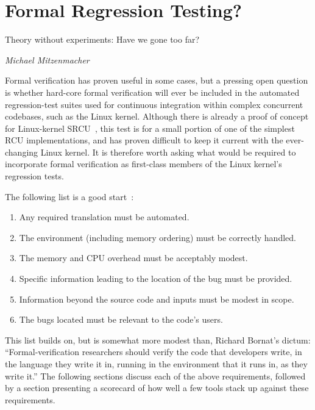 
\section{Formal Regression Testing?}
\label{sec:future:Formal Regression Testing?}
%
\epigraph{Theory without experiments: Have we gone too far?}
	 {\emph{Michael Mitzenmacher}}

Formal verification has proven useful in some cases, but a pressing open
question is whether hard-core formal verification will ever be included
in the automated regression-test suites used for continuous integration
within complex concurrent codebases, such as the Linux kernel.
Although there is already a proof of concept for Linux-kernel
SRCU~\cite{LanceRoy2017CBMC-SRCU}, this test is for a small portion
of one of the simplest RCU implementations, and has proven difficult
to keep it current with the ever-changing Linux kernel.
It is therefore worth asking what would be required to incorporate
formal verification as first-class members of the Linux kernel's
regression tests.

The following list is a good
start~\cite[slide 34]{PaulEMcKenney2015DagstuhlVerification}:

\begin{enumerate}
\item	Any required translation must be automated.
\item	The environment (including memory ordering) must be correctly
	handled.
\item	The memory and CPU overhead must be acceptably modest.
\item	Specific information leading to the location of the bug
	must be provided.
\item	Information beyond the source code and inputs must be
	modest in scope.
\item	The bugs located must be relevant to the code's users.
\end{enumerate}

This list builds on, but is somewhat more modest than, Richard Bornat's
dictum: ``Formal-verification researchers should verify the code that
developers write, in the language they write it in, running in the
environment that it runs in, as they write it.''
The following sections discuss each of the above requirements, followed
by a section presenting a scorecard of how well a few tools stack up
against these requirements.


